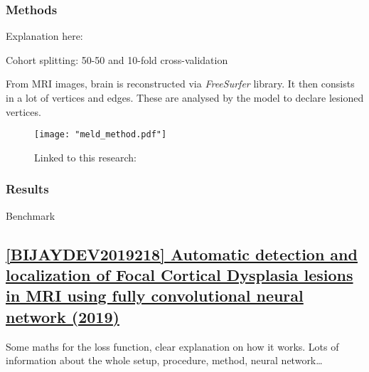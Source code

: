 \subsubsection{Methods}

Explanation here: 

Cohort splitting: 50-50 and 10-fold cross-validation

From MRI images, brain is reconstructed via \emph{FreeSurfer} library. It then consists in a lot of vertices and edges.
These are analysed by the model to declare lesioned vertices.

\begin{figure}[htbp]
	\centering
	\texttt{[image: "meld\_method.pdf"]}
	\caption{Linked to this research: }%
	\label{fig:meld_explanation}
\end{figure}

\subsubsection{Results}

\begin{table}[htbp]
	\centering
	\caption{Benchmark}

	\caption{Results}
\end{table}

\newpage
\subsection{\href{https://www.sciencedirect.com/science/article/pii/S1746809419301211\#sec0010}{[BIJAYDEV2019218] Automatic detection and localization of Focal Cortical Dysplasia lesions in MRI using fully convolutional neural network (2019)}}
\label{res4}

Some maths for the loss function, clear explanation on how it works.
Lots of information about the whole setup, procedure, method, neural network\dots

